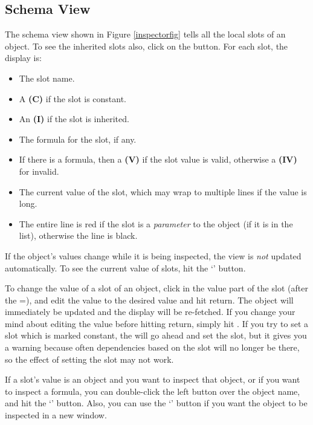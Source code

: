 \subsection{Schema View}
The schema view shown in Figure \ref{inspectorfig} tells all the local
slots of an object.  To see the inherited slots also, click on the
 button.  For each slot, the display is:
\begin{itemize}
\item The slot name.

\item A {\bf (C)} if the slot is constant.

\item An {\bf (I)} if the slot is inherited.

\item The formula for the slot, if any.

\item If there is a formula, then a {\bf (V)} if the slot value is valid,
otherwise a {\bf (IV)} for invalid.

\item The current value of the slot, which may wrap to multiple lines if the
value is long.

\item The entire line is red if the slot is a {\it parameter} to the object
(if it is in the  list), otherwise the line is black.
\end{itemize}

If the object's values change while it is being inspected, the view is
{\it not} updated automatically.  To see the current value of slots, hit
the `' button.

To change the value of a slot of an object, click in the value part of
the slot (after the =), and edit the value to the desired value and
hit return.  The object will immediately be updated and the 
display will be re-fetched.  If you change your mind about editing the value
before hitting return, simply hit .  If you try to set a
slot which is marked constant, the  will go ahead and set the
slot, but it gives you a warning because often dependencies based on
the slot will no longer be there, so the effect of setting the slot
may not work.

If a slot's value is an object and you want to inspect that
object, or if you want to inspect a formula, you can double-click the
left button over the object name, and hit the `' button.
Also, you can use the `' button if you want the object
to be inspected in a new window.

